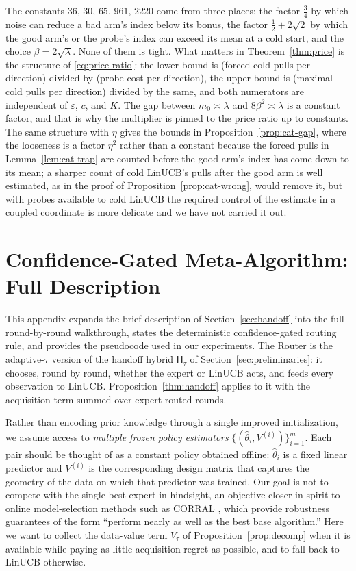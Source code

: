 \documentclass{article}
\theoremstyle{definition}
\theoremstyle{remark}
\newcommand{\eps}{\varepsilon}
\theoremstyle{remark}
\newcommand{\Hyb}{\mathsf{H}}
\begin{document}
The constants $36$, $30$, $65$, $961$, $2220$ come from three places: the
factor $\tfrac34$ by which noise can reduce a bad arm's index below its bonus,
the factor $\tfrac12+2\sqrt2$ by which the good arm's or the probe's index can
exceed its mean at a cold start, and the choice $\beta=2\sqrt\lambda$. None of
them is tight. What matters in Theorem~\ref{thm:price} is the structure of
\eqref{eq:price-ratio}: the lower bound is (forced cold pulls per direction)
divided by (probe cost per direction), the upper bound is (maximal cold pulls
per direction) divided by the same, and both numerators are independent of
$\eps$, $c$, and $K$. The gap between $m_0\asymp\lambda$ and $8\beta^2\asymp\lambda$
is a constant factor, and that is why the multiplier is pinned to the price
ratio up to constants. The same structure with $\eta$ gives the bounds in
Proposition~\ref{prop:cat-gap}, where the looseness is a factor $\eta^2$ rather
than a constant because the forced pulls in Lemma~\ref{lem:cat-trap} are
counted before the good arm's index has come down to its mean; a sharper
count of cold LinUCB's pulls after the good arm is well estimated, as in the
proof of Proposition~\ref{prop:cat-wrong}, would remove it, but with probes
available to cold LinUCB the required control of the estimate in a coupled
coordinate is more delicate and we have not carried it out.


\section{Confidence-Gated Meta-Algorithm: Full Description}
\label{app:meta-algorithm}

This appendix expands the brief description of
Section~\ref{sec:handoff} into the full round-by-round walkthrough,
states the deterministic confidence-gated routing rule, and provides
the pseudocode used in our experiments. The Router is the adaptive-$\tau$ version of the handoff hybrid
$\Hyb_\tau$ of Section~\ref{sec:preliminaries}: it chooses, round by round,
whether the expert or LinUCB acts, and feeds every observation to LinUCB.
Proposition~\ref{thm:handoff} applies to it with the acquisition term summed over
expert-routed rounds.

Rather than encoding prior knowledge through a single improved
initialization, we assume access to \emph{multiple frozen policy
estimators} $\{(\widehat\theta_i,V^{(i)})\}_{i=1}^m$. Each pair should
be thought of as a constant policy obtained offline:
$\widehat\theta_i$ is a fixed linear predictor and $V^{(i)}$ is the
corresponding design matrix that captures the geometry of the data on
which that predictor was trained. Our goal is not to compete with the
single best expert in hindsight, an objective closer in spirit to
online model-selection methods such as CORRAL
\cite{agarwal2017corralling,chen2024llmdecision}, which provide
robustness guarantees of the form ``perform nearly as well as the best
base algorithm.'' Here we want to collect the data-value term $V_\tau$ of
Proposition~\ref{prop:decomp} when it is available while paying as little
acquisition regret as possible, and to fall back to LinUCB otherwise.
\end{document}
